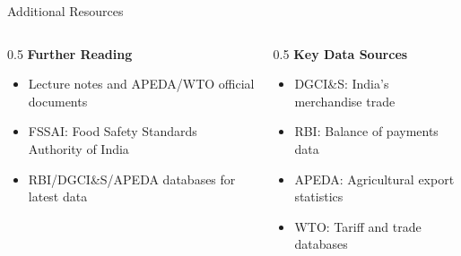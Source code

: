 \documentclass[
  ignorenonframetext,
  aspectratio=169,
]{beamer}
\makeatletter
\providecommand{\tightlist}{%
  \setlength{\itemsep}{0pt}\setlength{\parskip}{0pt}}
\let\quarto@originallabel\label
\DeclareRobustCommand*{\label}[1]{\quarto@originallabel{#1}}
\makeatother
\begin{document}
\begin{frame}{Additional Resources}
\label{additional-resources}
\begin{columns}[T]
\begin{column}{0.5\linewidth}
\textbf{Further Reading}

\begin{itemize}
\tightlist
\item
  Lecture notes and APEDA/WTO official documents
\item
  FSSAI: Food Safety Standards Authority of India
\item
  RBI/DGCI\&S/APEDA databases for latest data
\end{itemize}
\end{column}

\begin{column}{0.5\linewidth}
\textbf{Key Data Sources}

\begin{itemize}
\tightlist
\item
  DGCI\&S: India's merchandise trade
\item
  RBI: Balance of payments data\\
\item
  APEDA: Agricultural export statistics
\item
  WTO: Tariff and trade databases
\end{itemize}
\end{column}
\end{columns}
\end{frame}
\end{document}
